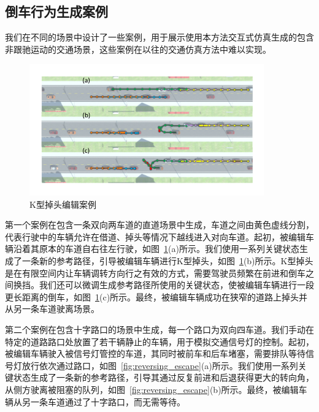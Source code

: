 \subsection{倒车行为生成案例}
\label{section:reversing_cases}



我们在不同的场景中设计了一些案例，用于展示使用本方法交互式仿真生成的包含非跟驰运动的交通场景，这些案例在以往的交通仿真方法中难以实现。

\begin{figure}[!tbh]
\centering
\includegraphics[width=0.9\textwidth]{figure/reversing/kturn v3.pdf}
\caption[K型掉头编辑案例]{
K型掉头编辑案例
}
\label{fig:reversing_kturn}
\end{figure}

第一个案例在包含一条双向两车道的直道场景中生成，车道之间由黄色虚线分割，代表行驶中的车辆允许在借道、掉头等情况下越线进入对向车道。起初，被编辑车辆沿着其原本的车道自右往左行驶，如图~\ref{fig:reversing_kturn}(a)所示。我们使用一系列关键状态生成了一条新的参考路径，引导被编辑车辆进行K型掉头，如图~\ref{fig:reversing_kturn}(b)所示。K型掉头是在有限空间内让车辆调转方向行之有效的方式，需要驾驶员频繁在前进和倒车之间换挡。我们还可以微调生成参考路径所使用的关键状态，使被编辑车辆进行一段更长距离的倒车，如图~\ref{fig:reversing_kturn}(c)所示。最终，被编辑车辆成功在狭窄的道路上掉头并从另一条车道驶离场景。


第二个案例在包含十字路口的场景中生成，每一个路口为双向四车道。我们手动在特定的道路路口处放置了若干辆静止的车辆，用于模拟交通信号灯的控制。起初，被编辑车辆驶入被信号灯管控的车道，其同时被前车和后车堵塞，需要排队等待信号灯放行依次通过路口，如图~\ref{fig:reversing_escape}(a)所示。我们使用一系列关键状态生成了一条新的参考路径，引导其通过反复前进和后退获得更大的转向角，从侧方驶离被阻塞的队列，如图~\ref{fig:reversing_escape}(b)所示。最终，被编辑车辆从另一条车道通过了十字路口，而无需等待。

